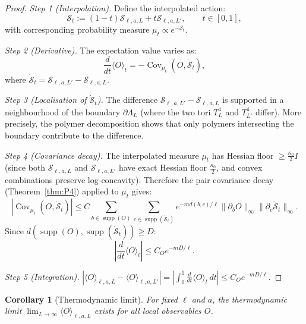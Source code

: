 \documentclass[12pt]{article}
\theoremstyle{plain}
\newtheorem{corollary}[theorem]{Corollary}
\theoremstyle{definition}
\numberwithin{equation}{section}
\newcommand{\Cov}{\operatorname{Cov}}
\newcommand{\supp}{\operatorname{supp}}
\begin{document}
\begin{proof}
\emph{Step 1 (Interpolation).}  Define the interpolated action:
\begin{equation}
\mathcal{S}_t := (1-t)\mathcal{S}_{\ell,a,L}+t\mathcal{S}_{\ell,a,L'},\qquad t\in[0,1],
\end{equation}
with corresponding probability measure $\mu_t\propto e^{-\mathcal{S}_t}$.

\emph{Step 2 (Derivative).}  The expectation value varies as:
\begin{equation}
\frac{d}{dt}\langle O\rangle_t = -\Cov_{\mu_t}(O,\dot{\mathcal{S}}_t),
\end{equation}
where $\dot{\mathcal{S}}_t=\mathcal{S}_{\ell,a,L'}-\mathcal{S}_{\ell,a,L}$.

\emph{Step 3 (Localisation of $\dot{\mathcal{S}}_t$).}  The difference $\mathcal{S}_{\ell,a,L'}-\mathcal{S}_{\ell,a,L}$ is supported in a neighbourhood of the boundary $\partial\Lambda_L$ (where the two tori $T^4_L$ and $T^4_{L'}$ differ).  More precisely, the polymer decomposition shows that only polymers intersecting the boundary contribute to the difference.

\emph{Step 4 (Covariance decay).}  The interpolated measure $\mu_t$ has Hessian floor $\geq\frac{\kappa_0}{2}I$ (since both $\mathcal{S}_{\ell,a,L}$ and $\mathcal{S}_{\ell,a,L'}$ have exact Hessian floor $\frac{\kappa_0}{2}$, and convex combinations preserve log-concavity).  Therefore the pair covariance decay (Theorem~\ref{thm:P4}) applied to $\mu_t$ gives:
\begin{equation}
|\Cov_{\mu_t}(O,\dot{\mathcal{S}}_t)| \leq C\sum_{b\in\supp(O)}\sum_{c\in\supp(\dot{\mathcal{S}}_t)}e^{-m d(b,c)/\ell}\|\partial_b O\|_\infty\|\partial_c\dot{\mathcal{S}}_t\|_\infty.
\end{equation}
Since $d(\supp(O),\supp(\dot{\mathcal{S}}_t))\geq D$:
\begin{equation}
\left|\frac{d}{dt}\langle O\rangle_t\right| \leq C_O e^{-mD/\ell}.
\end{equation}

\emph{Step 5 (Integration).}  $|\langle O\rangle_{\ell,a,L}-\langle O\rangle_{\ell,a,L'}|=|\int_0^1\frac{d}{dt}\langle O\rangle_t\,dt|\leq C_O e^{-mD/\ell}$.
\end{proof}

\begin{corollary}[Thermodynamic limit]\label{cor:thermolimit}
For fixed $\ell$ and $a$, the thermodynamic limit $\lim_{L\to\infty}\langle O\rangle_{\ell,a,L}$ exists for all local observables $O$.
\end{corollary}
\end{document}

